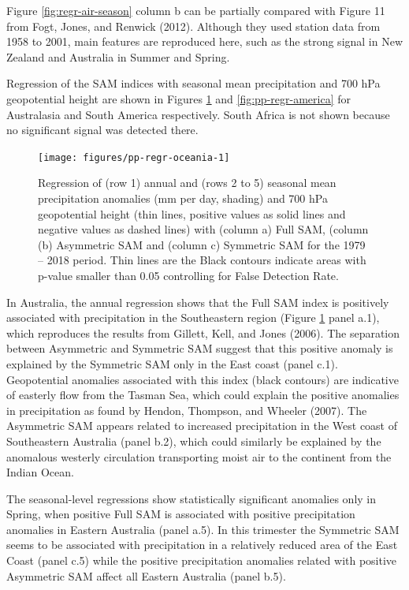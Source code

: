 \documentclass[smallextended]{svjour3}       %
\begin{document}
Figure \ref{fig:regr-air-season} column b can be partially compared with Figure 11 from Fogt, Jones, and Renwick (2012). Although they used station data from 1958 to 2001, main features are reproduced here, such as the strong signal in New Zealand and Australia in Summer and Spring.

Regression of the SAM indices with seasonal mean precipitation and 700 hPa geopotential height are shown in Figures \ref{fig:pp-regr-oceania} and \ref{fig:pp-regr-america} for Australasia and South America respectively. South Africa is not shown because no significant signal was detected there.

\begin{figure}
\texttt{[image: figures/pp-regr-oceania-1]} \caption{Regression of (row 1) annual and (rows 2 to 5) seasonal mean precipitation anomalies (mm per day, shading) and 700 hPa geopotential height (thin lines, positive values as solid lines and negative values as dashed lines) with (column a) Full SAM, (column (b) Asymmetric SAM and (column c) Symmetric SAM for the 1979 -- 2018 period. Thin lines are the Black contours indicate areas with p-value smaller than 0.05 controlling for False Detection Rate.}\label{fig:pp-regr-oceania}
\end{figure}

In Australia, the annual regression shows that the Full SAM index is positively associated with precipitation in the Southeastern region (Figure \ref{fig:pp-regr-oceania} panel a.1), which reproduces the results from Gillett, Kell, and Jones (2006). The separation between Asymmetric and Symmetric SAM suggest that this positive anomaly is explained by the Symmetric SAM only in the East coast (panel c.1). Geopotential anomalies associated with this index (black contours) are indicative of easterly flow from the Tasman Sea, which could explain the positive anomalies in precipitation as found by Hendon, Thompson, and Wheeler (2007). The Asymmetric SAM appears related to increased precipitation in the West coast of Southeastern Australia (panel b.2), which could similarly be explained by the anomalous westerly circulation transporting moist air to the continent from the Indian Ocean.

The seasonal-level regressions show statistically significant anomalies only in Spring, when positive Full SAM is associated with positive precipitation anomalies in Eastern Australia (panel a.5). In this trimester the Symmetric SAM seems to be associated with precipitation in a relatively reduced area of the East Coast (panel c.5) while the positive precipitation anomalies related with positive Asymmetric SAM affect all Eastern Australia (panel b.5).
\end{document}
